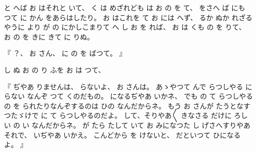 と
へば
お
はそれと
いて、
く
は
めざれども
は
お
の
を
て、
をさへ
ば
にも
つて
に
かん
をあらはしたり。
お
はこれを
て
お
には
へず、
るか
ぬか
れざるやうに
より
が
の
にかしこまりて
へ
し
お
を
れば、
お
は
くも
の
を
りて、
お
の
を
きに
きて
に
りぬ。

『
？、
お
さん、
に
の
を
ばつて。
』

し
ぬ
お
の
り
ふを
お
は
つて、

『
ぢやあ
りませんは、
らないよ、
お
さんは。
あゝやつて
んで
らつしやる
に
らない
なんぞ
つて
くのだもの。
になるぢやあ
いかネ、
でも
の
て
らつしやる
の
を
られたりなんぞするのは
ひの
なんだからネ。
もう
お
さんが
たうとなすつたゞけで
に
て
らつしやるのだよ。
して、そりやあ〳〵
きなさる
だけに
ろしい
の
い
なんだからネ。
が
たら
たして
いて
お
みになつた
し
げさへすりやあそれで、
いぢやあ
いかえ。
こんどから
を
けないと、
だといつて
ひになるよ。
』

